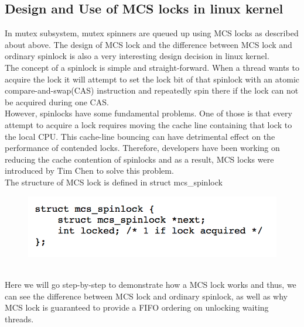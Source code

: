 \documentclass[10pt]{sigplanconf}
\begin{document}
\vspace{50pt}
\subsection{Design and Use of MCS locks in linux kernel}
In mutex subsystem, mutex spinners are queued up using MCS locks as described about above. 
The design of MCS lock and the difference between MCS lock and ordinary spinlock is also a very interesting design decision in linux kernel.\\
The concept of a spinlock is simple and straight-forward. When a thread wants to acquire the lock it will attempt to set the lock bit of that spinlock with an atomic compare-and-swap(CAS) instruction and repeatedly spin there if the lock can not be acquired during one CAS. \\
However, spinlocks have some fundamental problems. One of those is that every attempt to acquire a lock requires moving the cache line containing that lock to the local CPU. This cache-line bouncing can have detrimental effect on the performance of contended locks. Therefore, developers have been working on reducing the cache contention of spinlocks and as a result, MCS locks were introduced by Tim Chen to solve this problem.\\
The structure of MCS lock is defined in struct mcs\_spinlock\\
\begin{figure}[h!]
	\includegraphics[scale=0.7]{mcslock0.png}
\end{figure}\\
Here we will go step-by-step to demonstrate how a MCS lock works and thus, we can see the difference between MCS lock and ordinary spinlock, as well as why MCS lock is guaranteed to provide a FIFO ordering on unlocking waiting threads. \\
\end{document}
